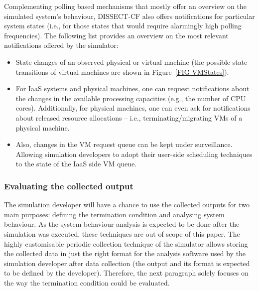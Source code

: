 \documentclass[sort, compress, 5p]{elsarticle}
\begin{document}
Complementing polling based mechanisms that mostly offer an overview on the simulated system's behaviour, DISSECT-CF also offers notifications for particular system states (i.e., for those states that would require alarmingly high polling frequencies). The following list provides an overview on the most relevant notifications offered by the simulator:
\begin{itemize}
\item State changes of an observed physical or virtual machine (the possible state transitions of virtual machines are shown in Figure~\ref{FIG-VMStates}).
\item For IaaS systems and physical machines, one can request notifications about the changes in the available processing capacities (e.g., the number of CPU cores). Additionally, for physical machines, one can even ask for notifications about released resource allocations -- i.e., terminating/migrating VMs of a physical machine.
\item Also, changes in the VM request queue can be kept under surveillance. Allowing simulation developers to adopt their user-side scheduling techniques to the state of the IaaS side VM queue.
\end{itemize}

\subsubsection{Evaluating the collected output}

The simulation developer will have a chance to use the collected outputs for two main purposes: defining the termination condition and analysing system behaviour. As the system behaviour analysis is expected to be done after the simulation was executed, these techniques are out of scope of this paper. The highly customisable periodic collection technique of the simulator allows storing the collected data in just the right format for the analysis software used by the simulation developer after data collection (the output and its format is expected to be defined by the developer). Therefore, the next paragraph solely focuses on the way the termination condition could be evaluated.
\end{document}

